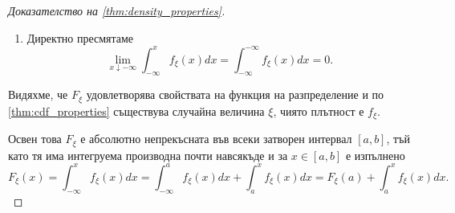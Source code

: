 \documentclass[
  headings=standardclasses,
  bibliography=totocnumbered,
]{scrartcl}
\begin{document}
\begin{proof}[Доказателство на \cref{thm:density_properties}]
\begin{enumerate}
    \item Директно пресмятаме
    \begin{equation*}
      \lim_{x \downarrow -\infty} \int_{-\infty}^x f_\xi(x) dx
      =
      \int_{-\infty}^{-\infty} f_\xi(x) dx
      =
      0.
    \end{equation*}
  \end{enumerate}

  Видяхме, че \( F_\xi \) удовлетворява свойствата на функция на разпределение и по \cref{thm:cdf_properties} съществува случайна величина \( \xi \), чиято плътност е \( f_\xi \).

  Освен това \( F_\xi \) е абсолютно непрекъсната във всеки затворен интервал \( [a, b] \), тъй като тя има интегруема производна почти навсякъде и за \( x \in [a, b] \) е изпълнено
  \begin{equation*}
    F_\xi(x)
    =
    \int_{-\infty}^x f_\xi(x) dx
    =
    \int_{-\infty}^a f_\xi(x) dx + \int_a^x f_\xi(x) dx
    =
    F_\xi(a) + \int_a^x f_\xi(x) dx.
  \end{equation*}
\end{proof}
\end{document}
